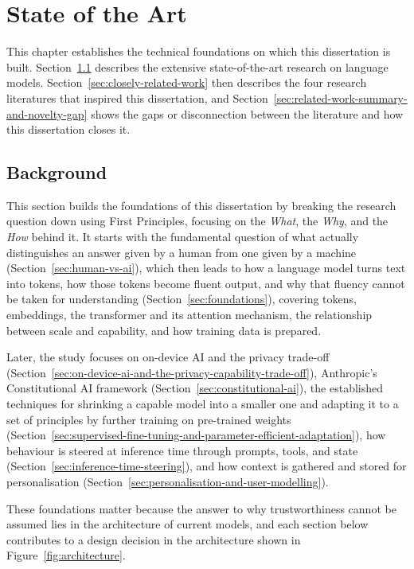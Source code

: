\chapter{State of the Art}
\label{chap:state-of-the-art}

This chapter establishes the technical foundations on which this dissertation is built. Section~\ref{sec:background} describes the extensive state-of-the-art research on language models. Section~\ref{sec:closely-related-work} then describes the four research literatures that inspired this dissertation, and Section~\ref{sec:related-work-summary-and-novelty-gap} shows the gaps or disconnection between the literature and how this dissertation closes it.

\section{Background}
\label{sec:background}
\label{chap:background}

This section builds the foundations of this dissertation by breaking the research question down using First Principles, focusing on the \emph{What}, the \emph{Why}, and the \emph{How} behind it. It starts with the fundamental question of what actually distinguishes an answer given by a human from one given by a machine (Section~\ref{sec:human-vs-ai}), which then leads to how a language model turns text into tokens, how those tokens become fluent output, and why that fluency cannot be taken for understanding (Section~\ref{sec:foundations}), covering tokens, embeddings, the transformer and its attention mechanism, the relationship between scale and capability, and how training data is prepared.

Later, the study focuses on on-device AI and the privacy trade-off (Section~\ref{sec:on-device-ai-and-the-privacy-capability-trade-off}), Anthropic's Constitutional AI framework (Section~\ref{sec:constitutional-ai}), the established techniques for shrinking a capable model into a smaller one and adapting it to a set of principles by further training on pre-trained weights (Section~\ref{sec:supervised-fine-tuning-and-parameter-efficient-adaptation}), how behaviour is steered at inference time through prompts, tools, and state (Section~\ref{sec:inference-time-steering}), and how context is gathered and stored for personalisation (Section~\ref{sec:personalisation-and-user-modelling}).

These foundations matter because the answer to why trustworthiness cannot be assumed lies in the architecture of current models, and each section below contributes to a design decision in the architecture shown in Figure~\ref{fig:architecture}.

